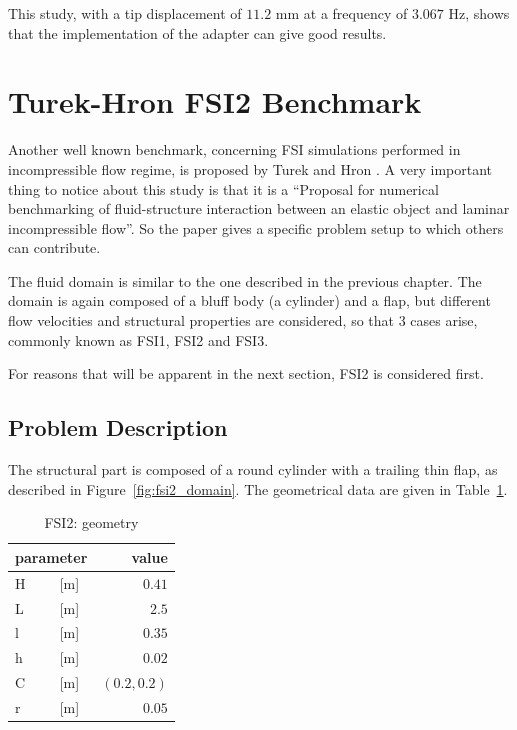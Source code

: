 This study, with a tip displacement of $11.2$ \si{mm} at a frequency of $3.067$ \si{Hz}, shows that the implementation of the adapter can give good results.

\newpage

\section{Turek-Hron FSI2 Benchmark}
\label{sec:FSI2}


Another well known benchmark, concerning FSI simulations performed in incompressible flow regime, is proposed by Turek and Hron \cite{turek2006proposal}.
A very important thing to notice about this study is that it is a ``Proposal for numerical benchmarking of fluid-structure interaction between an elastic object and laminar incompressible flow''. So the paper gives a specific problem setup to which others can contribute.

The fluid domain is similar to the one described in the previous chapter. The domain is again composed of a bluff body (a cylinder) and a flap, but different flow velocities and structural properties are considered, so that 3 cases arise, commonly known as FSI1, FSI2 and FSI3.

For reasons that will be apparent in the next section, FSI2 is considered first. 

\subsection{Problem Description}

The structural part is composed of a round cylinder with a trailing thin flap, as described in Figure~\ref{fig:fsi2_domain}. The geometrical data are given in Table~\ref{table:fsi2-geom}.

\begin{table}[!htb]
	\begin{center}
		\begin{tabular}{ l c | r } 
			\multicolumn{2}{c|}{parameter} & value   \\ 
			\hline
			H  & [\si{m}] & $0.41$     \\
			L &  [\si{m}] & $2.5$  \\
			l  & [\si{m}] & $0.35$  \\
			h  & [\si{m}] & $0.02$  \\
			C  & [\si{m}] & $\left(0.2,0.2 \right)$  \\
			r  & [\si{m}] & $0.05$  \\
		\end{tabular}
	\end{center}
	\caption{FSI2: geometry}
	\label{table:fsi2-geom}
\end{table}

